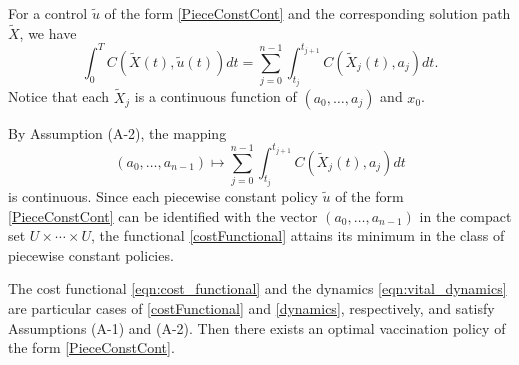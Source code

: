 For a control $\tilde{u}$ of the form \eqref{PieceConstCont} and the
corresponding solution path $\tilde{X}$, we have
\[
  \int_0^T
    C(\tilde{X}(t),
    \tilde{u}(t)) dt =
      \sum_{j=0}^{n-1}
        \int_{t_j}^{t_{j+1}}
        C(\tilde{X}_j(t),a_j) dt.
\]
Notice that each $\tilde{X}_j$ is a continuous function of $(a_0,\ldots,a_j)$
and $x_0$.

By Assumption (A-2), the mapping
\[
  (a_0,\ldots,a_{n-1})
  \mapsto
  \sum_{j=0}^{n-1}
  \int_{t_j}^{t_{j+1}} C(\tilde{X}_j(t),a_j) dt
\]
is continuous. Since each piecewise constant policy $\tilde{u}$ of the form
\eqref{PieceConstCont} can be identified with the vector $(a_0,\ldots,a_{n-1})$
in the compact set $U\times\cdots\times U$, the functional
\eqref{costFunctional} attains its minimum in the class of piecewise constant
policies.

    The cost functional \eqref{eqn:cost_functional} and the dynamics
\eqref{eqn:vital_dynamics} are particular cases of \eqref{costFunctional} and
\eqref{dynamics}, respectively, and satisfy Assumptions (A-1) and (A-2). Then
there exists an optimal vaccination policy of the form \eqref{PieceConstCont}.